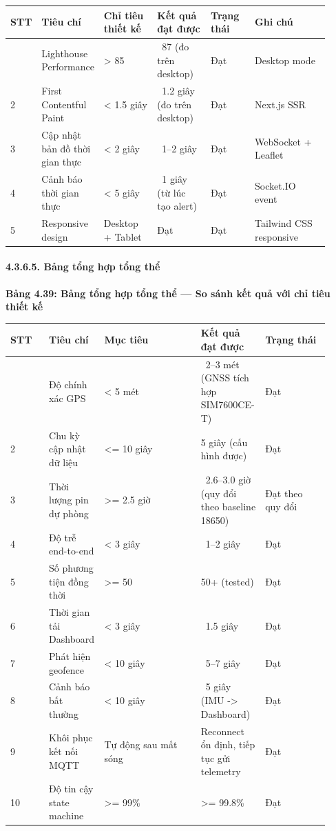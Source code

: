 \documentclass[13pt,a4paper]{extarticle}
\newcounter{none} %
\newcommand{\thesislongtableorignewline}{}
\let\thesislongtableorignewline\\
\renewcommand{\\}{\thesislongtableorignewline\hline}%
\let\\\thesislongtableorignewline
\newcommand{\thesistabletitle}[1]{%
  \begin{center}\textbf{#1}\end{center}%
}
\begin{document}
{\def\LTcaptype{none} %
\begin{longtable}{|p{0.06\linewidth}|p{0.14\linewidth}|p{0.17\linewidth}|p{0.17\linewidth}|p{0.14\linewidth}|p{0.24\linewidth}|}
\hline \textbf{STT} & \textbf{Tiêu chí} & \textbf{Chỉ tiêu thiết kế} & \textbf{Kết quả đạt được} & \textbf{Trạng thái} & \textbf{Ghi
chú} \\
\hline
\endhead
\hline
\endlastfoot
1 & Lighthouse Performance & \textgreater{} 85 & ~87 (đo
trên desktop) & Đạt & Desktop mode \\
2 & First Contentful Paint & \textless{} 1.5 giây & ~1.2
giây (đo trên desktop) & Đạt & Next.js SSR \\
3 & Cập nhật bản đồ thời gian thực & \textless{} 2 giây &
~1--2 giây & Đạt & WebSocket + Leaflet \\
4 & Cảnh báo thời gian thực & \textless{} 5 giây & ~1 giây
(từ lúc tạo alert) & Đạt & Socket.IO event \\
5 & Responsive design & Desktop + Tablet & Đạt & Đạt & Tailwind CSS
responsive \\
\end{longtable}
}

\paragraph{4.3.6.5. Bảng tổng hợp tổng
thể}\label{4365-bux1ea3ng-tux1ed5ng-hux1ee3p-tux1ed5ng-thux1ec3}

\thesistabletitle{Bảng 4.39: Bảng tổng hợp tổng thể --- So sánh kết quả với chỉ tiêu
thiết kế}

{\def\LTcaptype{none} %
\begin{longtable}{|p{0.12\linewidth}|p{0.10\linewidth}|p{0.30\linewidth}|p{0.20\linewidth}|p{0.20\linewidth}|}
\hline \textbf{STT} & \textbf{Tiêu chí} & \textbf{Mục tiêu} & \textbf{Kết quả đạt được} & \textbf{Trạng thái} \\
\hline
\endhead
\hline
\endlastfoot
1 & Độ chính xác GPS & \textless{} 5 mét & ~2--3 mét (GNSS
tích hợp SIM7600CE-T) & Đạt \\
2 & Chu kỳ cập nhật dữ liệu & \textless= 10 giây & 5 giây (cấu hình
được) & Đạt \\
3 & Thời lượng pin dự phòng & \textgreater= 2.5 giờ &
~2.6--3.0 giờ (quy đổi theo baseline 18650) & Đạt theo quy
đổi \\
4 & Độ trễ end-to-end & \textless{} 3 giây & ~1--2 giây &
Đạt \\
5 & Số phương tiện đồng thời & \textgreater= 50 & 50+ (tested) & Đạt \\
6 & Thời gian tải Dashboard & \textless{} 3 giây & ~1.5
giây & Đạt \\
7 & Phát hiện geofence & \textless{} 10 giây & ~5--7 giây
& Đạt \\
8 & Cảnh báo bất thường & \textless{} 10 giây & ~5 giây
(IMU -\textgreater{} Dashboard) & Đạt \\
9 & Khôi phục kết nối MQTT & Tự động sau mất sóng & Reconnect ổn định,
tiếp tục gửi telemetry & Đạt \\
10 & Độ tin cậy state machine & \textgreater= 99\% & \textgreater=
99.8\% & Đạt \\
\end{longtable}
}
\end{document}
